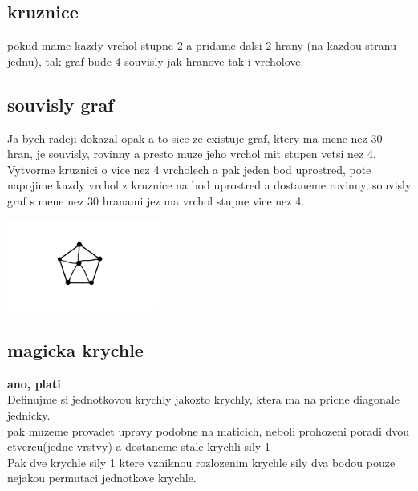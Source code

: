 \documentclass[a4paper]{article}
\begin{document}
\subsection{kruznice}
pokud mame kazdy vrchol stupne 2 a pridame dalsi 2 hrany (na kazdou stranu jednu), tak graf bude 4-souvisly jak hranove tak i vrcholove.

\subsection{souvisly graf}
Ja bych radeji dokazal opak a to sice ze existuje graf, ktery ma mene nez 30 hran, je souvisly, 
rovinny a presto muze jeho vrchol mit stupen vetsi nez 4.\\
Vytvorme kruznici o vice nez 4 vrcholech a pak jeden bod uprostred, pote napojime kazdy vrchol z kruznice na bod uprostred a dostaneme rovinny, souvisly graf s mene nez 30 hranami  jez ma vrchol stupne vice nez 4.

\includegraphics[height=3cm]{circle}

\subsection{magicka krychle}
\textbf{ano, plati}\\
Definujme si jednotkovou krychly jakozto krychly, ktera ma na pricne diagonale jednicky.\\
pak muzeme provadet upravy podobne na maticich, neboli prohozeni poradi dvou ctvercu(jedne vrstvy) a dostaneme stale krychli sily 1\\
Pak dve krychle sily 1 ktere vzniknou rozlozenim krychle sily dva bodou pouze nejakou permutaci jednotkove krychle.
\end{document}
